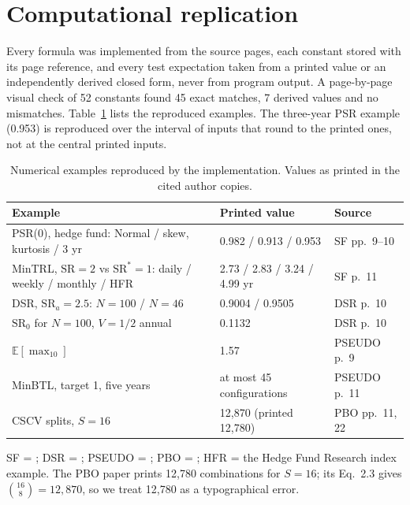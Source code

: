 \documentclass[11pt,a4paper]{article}
\newcommand{\SR}{\mathrm{SR}}
\newcommand{\E}{\mathbb{E}}
\begin{document}
\section{Computational replication}\label{sec:replication}

Every formula was implemented from the source pages, each constant stored with its page reference, and every test expectation taken from a printed value or an independently derived closed form, never from program output. A page-by-page visual check of 52 constants found 45 exact matches, 7 derived values and no mismatches. Table~\ref{tab:replication} lists the reproduced examples. The three-year PSR example (0.953) is reproduced over the interval of inputs that round to the printed ones, not at the central printed inputs.

\begin{table}[htbp]
\centering\footnotesize
\caption{Numerical examples reproduced by the implementation. Values as printed in the cited author copies.}\label{tab:replication}
\begin{tabular}{@{}lll@{}}
\toprule
Example & Printed value & Source \\
\midrule
PSR(0), hedge fund: Normal / skew, kurtosis / 3 yr & 0.982 / 0.913 / 0.953 & SF pp.~9--10 \\
MinTRL, $\SR=2$ vs $\SR^\ast=1$: daily / weekly / monthly / HFR & 2.73 / 2.83 / 3.24 / 4.99 yr & SF p.~11 \\
DSR, $\SR_a=2.5$: $N=100$ / $N=46$ & 0.9004 / 0.9505 & DSR p.~10 \\
$\SR_0$ for $N=100$, $V=1/2$ annual & 0.1132 & DSR p.~10 \\
$\E[\max_{10}]$ & 1.57 & PSEUDO p.~9 \\
MinBTL, target 1, five years & at most 45 configurations & PSEUDO p.~11 \\
CSCV splits, $S=16$ & 12,870 (printed 12,780) & PBO pp.~11, 22 \\
\bottomrule
\end{tabular}
\par\smallskip\raggedright\footnotesize SF = \citet{bailey2012frontier}; DSR = \citet{bailey2014dsr}; PSEUDO = \citet{bailey2014pseudo}; PBO = \citet{bailey2017pbo}; HFR = the Hedge Fund Research index example. The PBO paper prints 12,780 combinations for $S=16$; its Eq.~2.3 gives $\binom{16}{8}=12{,}870$, so we treat 12,780 as a typographical error.
\end{table}
\end{document}
